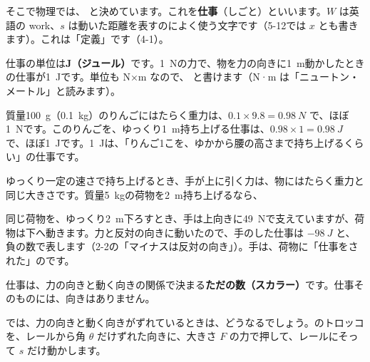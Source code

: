 \par\vspace{4pt}
そこで物理では、
と決めています。これを\textbf{仕事}（しごと）といいます。$W$ は英語の work、$s$ は動いた距離を表すのによく使う文字です（5-12では $x$ とも書きます）。これは「定義」です（4-1）。

仕事の単位は\textbf{J（ジュール）}です。\qty{1}{N}の力で、物を力の向きに\qty{1}{m}動かしたときの仕事が\qty{1}{J}です。単位も N×m なので、
と書けます（N·m は「ニュートン・メートル」と読みます）。

質量\qty{100}{g}（\qty{0.1}{kg}）のりんごにはたらく重力は、$0.1\times9.8=\qty{0.98}{N}$ で、ほぼ\qty{1}{N}です。このりんごを、ゆっくり\qty{1}{m}持ち上げる仕事は、$0.98\times1=\qty{0.98}{J}$ で、ほぼ\qty{1}{J}です。\qty{1}{J}は、「りんご1こを、ゆかから腰の高さまで持ち上げるくらい」の仕事です。

ゆっくり一定の速さで持ち上げるとき、手が上に引く力は、物にはたらく重力と同じ大きさです。質量\qty{5}{kg}の荷物を\qty{2}{m}持ち上げるなら、

同じ荷物を、ゆっくり\qty{2}{m}下ろすとき、手は上向きに\qty{49}{N}で支えていますが、荷物は下へ動きます。力と反対の向きに動いたので、手のした仕事は $-\qty{98}{J}$ と、負の数で表します（2-2の「マイナスは反対の向き」）。手は、荷物に「仕事をされた」のです。

仕事は、力の向きと動く向きの関係で決まる\textbf{ただの数（スカラー）}です。仕事そのものには、向きはありません。


\label{bk:4-12:naname}では、力の向きと動く向きがずれているときは、どうなるでしょう。\bkhatenaref のトロッコを、レールから角 $\theta$ だけずれた向きに、大きさ $F$ の力で押して、レールにそって $s$ だけ動かします。


